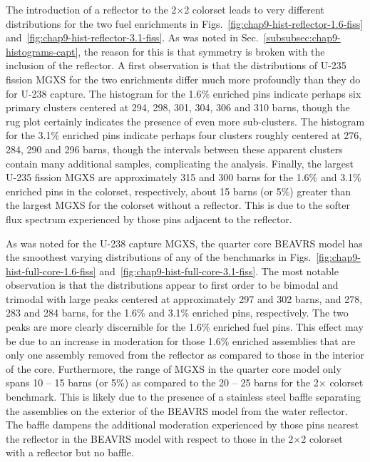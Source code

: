 The introduction of a reflector to the 2$\times$2 colorset leads to very different distributions for the two fuel enrichments in Figs.~\ref{fig:chap9-hist-reflector-1.6-fiss} and~\ref{fig:chap9-hist-reflector-3.1-fiss}. As was noted in Sec.~\ref{subsubsec:chap9-histograms-capt}, the reason for this is that symmetry is broken with the inclusion of the reflector. A first observation is that the distributions of U-235 fission \ac{MGXS} for the two enrichments differ much more profoundly than they do for U-238 capture. The histogram for the 1.6\% enriched pins indicate perhaps six primary clusters centered at 294, 298, 301, 304, 306 and 310 barns, though the rug plot certainly indicates the presence of even more sub-clusters. The histogram for the 3.1\% enriched pins indicate perhaps four clusters roughly centered at 276, 284, 290 and 296 barns, though the intervals between these apparent clusters contain many additional samples, complicating the analysis. Finally, the largest U-235 fission \ac{MGXS} are approximately 315 and 300 barns for the 1.6\% and 3.1\% enriched pins in the colorset, respectively, about 15 barns (or 5\%) greater than the largest \ac{MGXS} for the colorset without a reflector. This is due to the softer flux spectrum experienced by those pins adjacent to the reflector.

As was noted for the U-238 capture \ac{MGXS}, the quarter core \ac{BEAVRS} model has the smoothest varying distributions of any of the benchmarks in Figs.~\ref{fig:chap9-hist-full-core-1.6-fiss} and~\ref{fig:chap9-hist-full-core-3.1-fiss}. The most notable observation is that the distributions appear to first order to be bimodal and trimodal with large peaks centered at approximately 297 and 302 barns, and 278, 283 and 284 barns, for the 1.6\% and 3.1\% enriched pins, respectively. The two peaks are more clearly discernible for the 1.6\% enriched fuel pins. This effect may be due to an increase in moderation for those 1.6\% enriched assemblies that are only one assembly removed from the reflector as compared to those in the interior of the core. Furthermore, the range of \ac{MGXS} in the quarter core model only spans 10 -- 15 barns (or 5\%) as compared to the 20 -- 25 barns for the 2$\times$ colorset benchmark. This is likely due to the presence of a stainless steel baffle separating the assemblies on the exterior of the \ac{BEAVRS} model from the water reflector. The baffle dampens the additional moderation experienced by those pins nearest the reflector in the \ac{BEAVRS} model with respect to those in the 2$\times$2 colorset with a reflector but no baffle.

